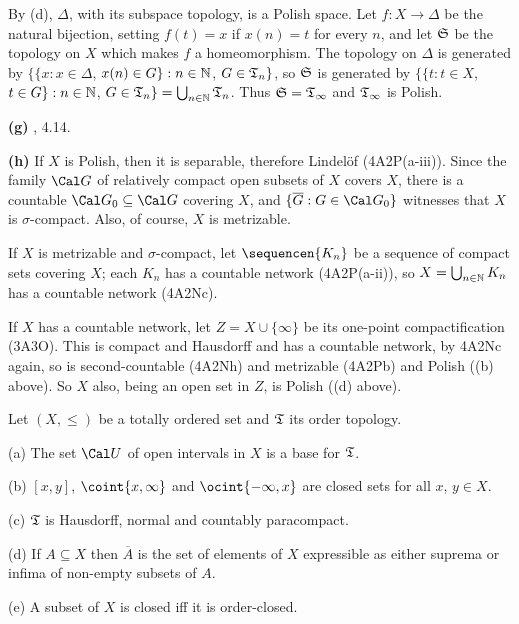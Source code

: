 {By (d), $\Delta$, with its subspace topology, is a Polish space.   Let
$f:X\to\Delta$ be the natural bijection, setting $f(t)=x$ if $x(n)=t$
for every $n$, and let $\frak S$ be the topology on $X$ which makes $f$
a homeomorphism.   The topology on $\Delta$ is generated by
$\{\{x:x\in\Delta$, $x(n)\in G\}:n\in\Bbb N$, $G\in\frak T_n\}$, so
$\frak S$ is generated by
$\{\{t:t\in X$, $t\in G\}:n\in\Bbb N$, $G\in\frak T_n\}
=\bigcup_{n\in\Bbb N}\frak T_n$.   Thus $\frak S=\frak T_{\infty}$ and
$\frak T_{\infty}$ is Polish.

\medskip

{\bf (g)} \Kechris, 4.14.

\medskip

{\bf (h)} If $X$ is Polish, then it is separable,
therefore Lindel\"of (4A2P(a-iii)).   Since the family
$\Cal G$ of relatively compact open subsets of $X$ covers $X$, there is a
countable $\Cal G_0\subseteq\Cal G$ covering $X$, and
$\{\overline{G}:G\in\Cal G_0\}$ witnesses that $X$ is $\sigma$-compact.
Also, of course, $X$ is metrizable.

If $X$ is metrizable and $\sigma$-compact, let $\sequencen{K_n}$ be a
sequence of compact sets covering $X$;  each $K_n$ has a countable network
(4A2P(a-ii)), so $X=\bigcup_{n\in\Bbb N}K_n$ has a countable network
(4A2Nc).

If $X$ has a countable network, let $Z=X\cup\{\infty\}$ be its one-point
compactification (3A3O).   This is compact and Hausdorff and has a
countable network, by 4A2Nc again, so is second-countable (4A2Nh)
and metrizable (4A2Pb) and Polish ((b) above).
So $X$ also, being an open set in $Z$, is Polish ((d) above).
}%

 Let $(X,\le)$ be a totally ordered set
and $\frak T$ its order topology.

(a) The set $\Cal U$ of open intervals in $X$ is a base for $\frak T$.

(b) $[x,y]$,
$\coint{x,\infty}$ and $\ocint{-\infty,x}$ are closed sets for all $x$,
$y\in X$.

(c) $\frak T$ is Hausdorff,
normal and countably paracompact.

(d) If $A\subseteq X$ then $\overline{A}$ is the set of
elements of $X$ expressible as either suprema or infima of
non-empty subsets of $A$.

(e) A subset of $X$ is closed iff it is order-closed.

